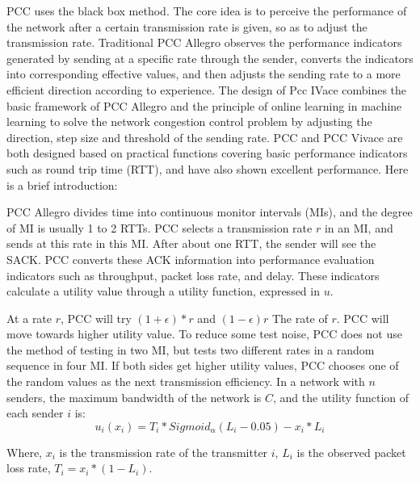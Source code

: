 \documentclass[conference]{IEEEtran}
\begin{document}
PCC uses the black box method. The core idea is to perceive the performance of the network after a certain transmission rate is given, so as to adjust the transmission rate. Traditional PCC Allegro observes the performance indicators generated by sending at a specific rate through the sender, converts the indicators into corresponding effective values, and then adjusts the sending rate to a more efficient direction according to experience. The design of Pcc IVace combines the basic framework of PCC Allegro and the principle of online learning in machine learning to solve the network congestion control problem by adjusting the direction, step size and threshold of the sending rate. PCC and PCC Vivace are both designed based on practical functions covering basic performance indicators such as round trip time (RTT), and have also shown excellent performance. Here is a brief introduction:

PCC Allegro\cite{a6} divides time into continuous monitor intervals (MIs), and the degree of MI is usually 1 to 2 RTTs. PCC selects a transmission rate $r$ in an MI, and sends at this rate in this MI. After about one RTT, the sender will see the SACK. PCC converts these ACK information into performance evaluation indicators such as throughput, packet loss rate, and delay. These indicators calculate a utility value through a utility function, expressed in $u$.

At a rate $r$, PCC will try $(1+\epsilon)*r$ and $(1-\epsilon)r$ The rate of $r$. PCC will move towards higher utility value. To reduce some test noise, PCC does not use the method of testing in two MI, but tests two different rates in a random sequence in four MI. If both sides get higher utility values, PCC chooses one of the random values as the next transmission efficiency. In a network with $n$ senders, the maximum bandwidth of the network is $C$, and the utility function of each sender $i$ is:
\begin{equation}
    u_i(x_i)=T_i* Sigmoid_\alpha(L_i-0.05)-x_i * L_i
\end{equation}

Where, $x_i$ is the transmission rate of the transmitter $i$, $L_i$ is the observed packet loss rate, $T_i=x_i* (1-L_i)$.
\end{document}
